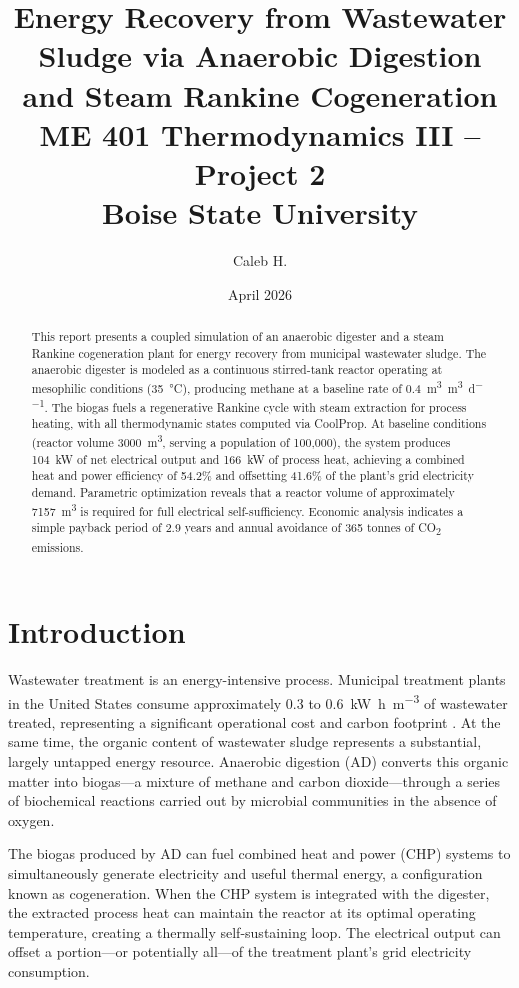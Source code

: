 \documentclass[12pt, letterpaper]{article}
\title{%
  \textbf{Energy Recovery from Wastewater Sludge via Anaerobic Digestion and Steam Rankine Cogeneration} \\[0.5em]
  \large ME 401 Thermodynamics III -- Project 2 \\
  Boise State University
}
\author{Caleb H.}
\date{April 2026}
\begin{document}
\maketitle

\begin{abstract}
This report presents a coupled simulation of an anaerobic digester and a steam Rankine cogeneration plant for energy recovery from municipal wastewater sludge. The anaerobic digester is modeled as a continuous stirred-tank reactor operating at mesophilic conditions (\SI{35}{\celsius}), producing methane at a baseline rate of \SI{0.4}{\cubic\metre\per\cubic\metre\per\day}. The biogas fuels a regenerative Rankine cycle with steam extraction for process heating, with all thermodynamic states computed via CoolProp. At baseline conditions (reactor volume \SI{3000}{\cubic\metre}, serving a population of 100,000), the system produces \SI{104}{\kilo\watt} of net electrical output and \SI{166}{\kilo\watt} of process heat, achieving a combined heat and power efficiency of 54.2\% and offsetting 41.6\% of the plant's grid electricity demand. Parametric optimization reveals that a reactor volume of approximately \SI{7157}{\cubic\metre} is required for full electrical self-sufficiency. Economic analysis indicates a simple payback period of 2.9 years and annual avoidance of 365 tonnes of CO\textsubscript{2} emissions.
\end{abstract}

\section{Introduction}

Wastewater treatment is an energy-intensive process. Municipal treatment plants in the United States consume approximately \SI{0.3}{} to \SI{0.6}{\kilo\watt\hour\per\cubic\metre} of wastewater treated, representing a significant operational cost and carbon footprint \citep{nathia2018}. At the same time, the organic content of wastewater sludge represents a substantial, largely untapped energy resource. Anaerobic digestion (AD) converts this organic matter into biogas---a mixture of methane and carbon dioxide---through a series of biochemical reactions carried out by microbial communities in the absence of oxygen.

The biogas produced by AD can fuel combined heat and power (CHP) systems to simultaneously generate electricity and useful thermal energy, a configuration known as cogeneration. When the CHP system is integrated with the digester, the extracted process heat can maintain the reactor at its optimal operating temperature, creating a thermally self-sustaining loop. The electrical output can offset a portion---or potentially all---of the treatment plant's grid electricity consumption.
\end{document}
